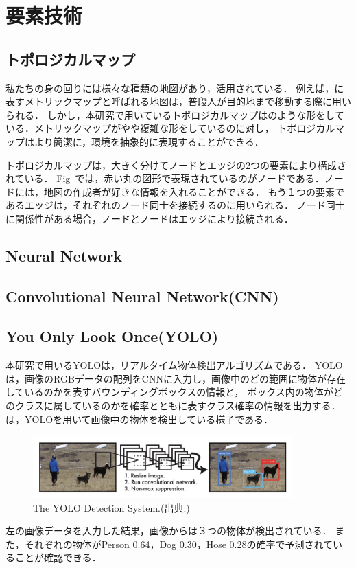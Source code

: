 \documentclass[../main]{subfiles}
\begin{document}
\setcounter{secnumdepth}{4}
    \chapter{要素技術}
        \section{トポロジカルマップ}
        私たちの身の回りには様々な種類の地図があり，活用されている．
        例えば，に表すメトリックマップと呼ばれる地図は，普段人が目的地まで移動する際に用いられる．
        しかし，本研究で用いているトポロジカルマップはのような形をしている．メトリックマップがやや複雑な形をしているのに対し，
        トポロジカルマップはより簡潔に，環境を抽象的に表現することができる．

        
        トポロジカルマップは，大きく分けてノードとエッジの2つの要素により構成されている．
        Fig~では，赤い丸の図形で表現されているのがノードである．ノードには，地図の作成者が好きな情報を入れることができる．
        もう１つの要素であるエッジは，それぞれのノード同士を接続するのに用いられる．
        ノード同士に関係性がある場合，ノードとノードはエッジにより接続される．
    
        \section{Neural Network}
        \newpage
        \section{Convolutional Neural Network(CNN)}
        \section{You Only Look Once(YOLO)}
        本研究で用いるYOLO\cite{yolo_paper_fig}は，リアルタイム物体検出アルゴリズムである．
        YOLOは，画像のRGBデータの配列をCNNに入力し，画像中のどの範囲に物体が存在しているのかを表すバウンディングボックスの情報と，
        ボックス内の物体がどのクラスに属しているのかを確率とともに表すクラス確率の情報を出力する．
        は，YOLOを用いて画像中の物体を検出している様子である． 

        \begin{figure}[H]
        \centering
        \includegraphics[width=10cm]{yolo_exp.png}
        \caption{The YOLO Detection System.(出典:)}
        \label{figure::yolo_exp}
        \end{figure}
        左の画像データを入力した結果，画像からは３つの物体が検出されている．
        また，それぞれの物体がPerson 0.64，Dog 0.30，Hose 0.28の確率で予測されていることが確認できる．
    
\end{document}
